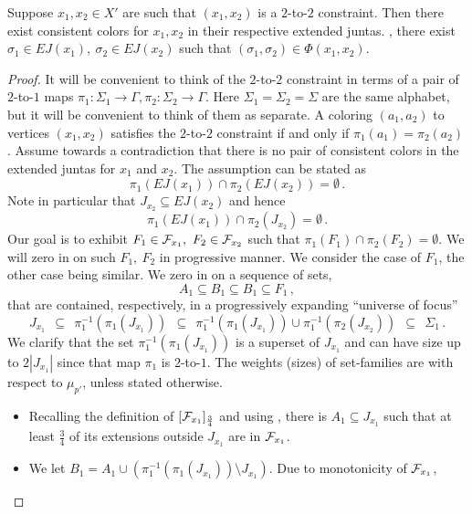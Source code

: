 \documentclass{toc}
\begin{document}
\begin{lemma}\label{lemma:there_is_constraint}
Suppose $x_1,x_2\in X'$ are such that $(x_1,x_2)$ is a $2$-to-$2$ constraint.
Then there exist consistent colors
for $x_1,x_2$ in their respective  %
extended juntas. \ie, there exist $\sigma_1  \in EJ(x_1), ~\sigma_2 \in EJ(x_2)$
such that $(\sigma_1, \sigma_2) \in \Phi(x_1, x_2)$.
\end{lemma}
\begin{proof}
It will be
convenient to think of the $2$-to-$2$ constraint in terms of a pair of $2$-to-$1$ maps
$\pi_1: \Sigma_1 \to \Gamma, \pi_2: \Sigma_2 \to \Gamma$. Here $\Sigma_1 = \Sigma_2 = \Sigma$ are
the same alphabet, but it will be convenient to think of them as separate.
A coloring $(a_1, a_2)$ to vertices $(x_1, x_2)$ satisfies the
$2$-to-$2$ constraint if and only if $\pi_1(a_1) = \pi_2(a_2)$. Assume towards a contradiction that
there is no pair of consistent colors in the extended juntas for $x_1$ and $x_2$.
The assumption can be stated as
 $$  \pi_1 ( EJ(x_1) ) \cap \pi_2 (EJ(x_2) ) = \emptyset\,. $$%
Note in particular that $J_{x_2} \subseteq EJ(x_2)$ and hence
\begin{equation} \label{eqn:assumption}
    \pi_1 ( EJ(x_1) ) \cap  \pi_2 ( J_{x_2} ) = \emptyset\,.%
\end{equation}
Our goal is to exhibit $F_1 \in {\cal F}_{x_1}, ~F_2 \in {\cal F}_{x_2}$ such that $\pi_1(F_1)
\cap \pi_2(F_2) = \emptyset$. We will zero in on such $F_1, ~F_2$ in progressive manner.
%
We consider the case of $F_1$, the other case being similar. We zero in on
a sequence of sets,  %
 $$ A_1  \subseteq B_1 \subseteq B_1  \subseteq  F_1\,, $$%
that are contained, respectively, %
in a %
progressively expanding ``universe of focus''
 $$ J_{x_1} \ \ \subseteq \ \  \pi_1^{-1} ( \pi_1( J_{x_1} ) )  \ \  \subseteq \  \
    \pi_1^{-1}( \pi_1 ( J_{x_1}  ) ) \cup  \pi_1^{-1} ( \pi_2  ( J_{x_2} ) )  \ \  \subseteq \ \ \Sigma_1\,.$$%
    We clarify that the set $ \pi_1^{-1} ( \pi_1( J_{x_1} ) ) $ is a superset of $J_{x_1}$
    and can have size up to $2 |J_{x_1}|$ since that map $\pi_1$ is $2$-to-$1$.
The weights (sizes) of set-families are with respect to $\mu_{p'}$, unless stated otherwise.
\begin{itemize}
\item Recalling the definition of $[{\cal F}_{x_1}]_{\frac{3}{4}}$ and using ,
    there is
      $A_1 \subseteq J_{x_1}$ such that at least $\frac{3}{4}$ of its extensions outside $J_{x_1}$
      are in ${\cal F}_{x_1}$.
\item We let $B_1 =  A_1  \cup \left(  \pi_1^{-1} ( \pi_1( J_{x_1} ) )  \setminus J_{x_1}  \right)$. Due to monotonicity of ${\cal F}_{x_1}$,

\end{itemize}
\end{proof}
\end{document}
